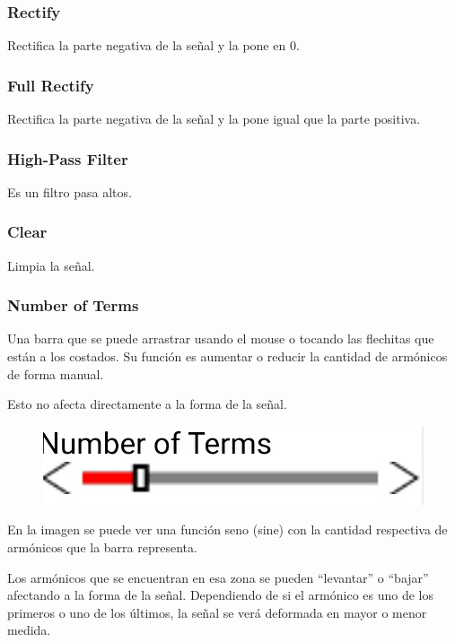 \documentclass[../main.tex]{subfiles}
\begin{document}
	\subsubsection{Rectify}
	Rectifica la parte negativa de la señal y la pone en 0.

	\subsubsection{Full Rectify}
	Rectifica la parte negativa de la señal y la pone igual que la parte positiva.

	\subsubsection{High-Pass Filter}
	Es un filtro pasa altos.

	\subsubsection{Clear}
	Limpia la señal.


	\subsubsection{Number of Terms}
	Una barra que se puede arrastrar usando el mouse o tocando las flechitas que están
	a los costados. Su función es aumentar o reducir la cantidad de armónicos de forma
	manual. 

	Esto no afecta directamente a la forma de la señal.
	\begin{figure}[H]
		\includegraphics[width= 0.6 \textwidth]{imagen15.jpg}
		\centering
	\end{figure}
	En la imagen se puede ver una función seno (sine) con la cantidad respectiva de armónicos que la barra representa.

	\begin{figure}[H]
		\centering
	\end{figure}

	Los armónicos que se encuentran en esa zona se pueden “levantar” o “bajar” afectando
	a la forma de la señal. Dependiendo de si el armónico es uno de los primeros o uno de
	los últimos, la señal se verá deformada en mayor o menor medida.
\end{document}
